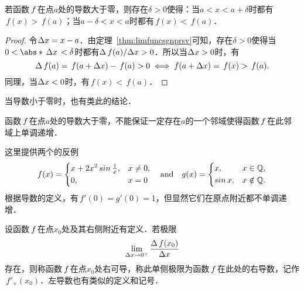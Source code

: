 \begin{example*}
  若函数\(\,f\mkern2mu\)在点\(a\)处的导数大于零，则存在\(\delta > 0\)使得：当\(a < x < a+\delta\)时都有\(\,f(x) > \,f(a)\)；当\(a-\delta < x < a\)时都有\(\,f(x) < \,f(a)\)．

  \begin{proof}
    令\(\mathop{}\!\Delta x = x - a\)．由定理~\ref{thm:limfuncsgnprsv}可知，存在\(\delta > 0\)使得当\(0 < \abs*{\,\fdx\,} < \delta\)时都有\(\mathop{}\!\Delta\,f(a)/\!\mathop{}\!\Delta x > 0\)．所以当\(\mathop{}\!\Delta x > 0\)时，有
    \begin{equation*}
      \mathop{}\!\Delta\,f(a) = \,f(a+\mathop{}\!\Delta x) - \,f(a) > 0
      \iff
      f(a+\mathop{}\!\Delta x) = \,f(x) > \,f(a).
    \end{equation*}
    同理，当\(\mathop{}\!\Delta x < 0\)时，有\(\,f(x) < \,f(a)\)．
  \end{proof}

  \begin{remark}
    当导数小于零时，也有类此的结论．
  \end{remark}
\end{example*}

\begin{example*}
  函数\(\,f\mkern2mu\)在点\(a\)处的导数大于零，不能保证一定存在\(a\)的一个邻域使得函数\(\,f\mkern2mu\)在此邻域上单调递增．

  \begin{remark}
    这里提供两个的反例
    \begin{equation*}
      f(x) =
      \begin{dcases}
        x + 2 x^2 \operatorname{\smash{sin}}\tfrac1x, & x \ne 0, \\
        0, & x = 0
      \end{dcases}
      \quad \text{and} \quad
      g(x) =
      \begin{dcases}
        x, & x \in \mathbb{Q}, \\
        \operatorname{\smash{sin}} x, & x \notin \mathbb{Q}.
      \end{dcases}
    \end{equation*}
    根据导数的定义，有\(\,f'(0) = g'(0) = 1\)，但显然它们在原点附近都不单调递增．
  \end{remark}
\end{example*}

\begin{definition*}
  设函数\(\,f\mkern2mu\)在点\(x_0\)处及其右侧附近有定义．若极限
  \begin{equation*}
    \lim_{\mathop{}\!\Delta x \to 0^+} \frac{\mathop{}\!\Delta\,f(x_0)}{\mathop{}\!\Delta x}
  \end{equation*}
  存在，则称函数\(\,f\mkern2mu\)在点\(x_0\)处右可导，称此单侧极限为函数\(\,f\mkern2mu\)在此处的右导数，记作\(\,f'_+(x_0)\)．左导数也有类似的定义和记号．
\end{definition*}

